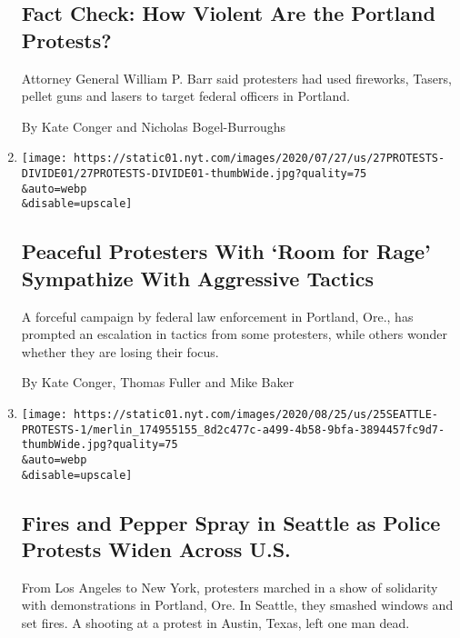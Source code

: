 \begin{enumerate}
  \hypertarget{fact-check-how-violent-are-the-portland-protests}{%
  \subsection{Fact Check: How Violent Are the Portland
  Protests?}\label{fact-check-how-violent-are-the-portland-protests}}

  Attorney General William P. Barr said protesters had used fireworks,
  Tasers, pellet guns and lasers to target federal officers in Portland.

  By Kate Conger and Nicholas Bogel-Burroughs
\item
  \href{/2020/07/27/us/protests-divisions-blm.html}{}

  \texttt{[image: https://static01.nyt.com/images/2020/07/27/us/27PROTESTS-DIVIDE01/27PROTESTS-DIVIDE01-thumbWide.jpg?quality=75\\\&auto=webp\\\&disable=upscale]}

  \hypertarget{peaceful-protesters-with-room-for-rage-sympathize-with-aggressive-tactics}{%
  \subsection{Peaceful Protesters With `Room for Rage' Sympathize With
  Aggressive
  Tactics}\label{peaceful-protesters-with-room-for-rage-sympathize-with-aggressive-tactics}}

  A forceful campaign by federal law enforcement in Portland, Ore., has
  prompted an escalation in tactics from some protesters, while others
  wonder whether they are losing their focus.

  By Kate Conger, Thomas Fuller and Mike Baker
\item
  \href{/2020/07/25/us/protests-seattle-portland.html}{}

  \texttt{[image: https://static01.nyt.com/images/2020/08/25/us/25SEATTLE-PROTESTS-1/merlin\_174955155\_8d2c477c-a499-4b58-9bfa-3894457fc9d7-thumbWide.jpg?quality=75\\\&auto=webp\\\&disable=upscale]}

  \hypertarget{fires-and-pepper-spray-in-seattle-as-police-protests-widen-across-us}{%
  \subsection{Fires and Pepper Spray in Seattle as Police Protests Widen
  Across
  U.S.}\label{fires-and-pepper-spray-in-seattle-as-police-protests-widen-across-us}}

  From Los Angeles to New York, protesters marched in a show of
  solidarity with demonstrations in Portland, Ore. In Seattle, they
  smashed windows and set fires. A shooting at a protest in Austin,
  Texas, left one man dead.


\end{enumerate}
